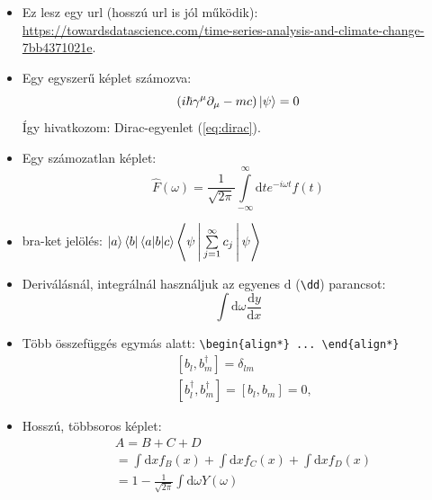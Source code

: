 \documentclass[12pt]{article}
\theoremstyle{plain}
\newcommand{\dd}{\textrm{d}}
\begin{document}
\begin{itemize}
    \item Ez lesz egy url (hosszú url is jól működik): \url{https://towardsdatascience.com/time-series-analysis-and-climate-change-7bb4371021e}.
    
    \item Egy egyszerű képlet számozva:
    \begin{equation}
        (i\hbar\gamma^{\mu}\partial_{\mu} - mc)\ket\psi = 0
        \label{eq:dirac}
    \end{equation}
    Így hivatkozom: Dirac-egyenlet (\ref{eq:dirac}).

    \item Egy számozatlan képlet:
    \begin{equation*}
        \hat F (\omega) = \frac{1}{\sqrt{2\pi}} \int\limits^{\infty}_{-\infty} \dd t e^{-i\omega t}f(t) 
    \end{equation*}

    \item bra-ket jelölés: $\ket a \bra b \braket{a|b|c} \Braket{\psi|\sum\limits_{j=1}^{\infty} c_j | \psi}$
    
    \item Deriválásnál, integrálnál használjuk az egyenes $\dd$ (\texttt{\textbackslash dd}) parancsot: 
    \begin{equation*}
        \int \dd \omega \frac{\dd y}{\dd x}
    \end{equation*}

    \item Több összefüggés egymás alatt: \texttt{\textbackslash begin\{align*\} ... \textbackslash end\{align*\}}
    \begin{align*}
        &[b_l, b^\dagger_m] = \delta_{lm} \\
        &[b^\dagger_l, b^\dagger_m] = [b_l,b_m]=0 \textrm{,}
    \end{align*}

    \item Hosszú, többsoros képlet:
    \begin{align*}
        & A = B + C + D   \\
        & = \int \dd x f_B(x) + \int \dd x f_C(x) + \int \dd x f_D(x) \\
        & = 1-\frac{1}{\sqrt{2\pi}}\int \dd\omega Y(\omega)
    \end{align*}  
    

\end{itemize}
\end{document}
